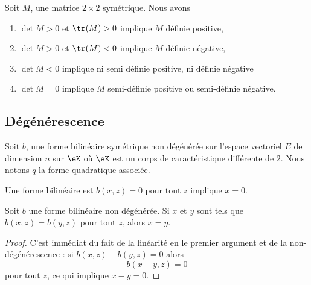 \begin{proposition}     \label{PropcnJyXZ}
    Soit $M$, une matrice $2\times 2$ symétrique. Nous avons
    \begin{enumerate}
        \item
        $\det M>0$ et $\tr(M)>0$ implique $M$ définie positive,
        \item
        $\det M>0$ et $\tr(M)<0$ implique $M$ définie négative,
    \item   \label{ItemluuFPN}
        $\det M<0$ implique ni semi définie positive, ni définie négative 
        \item
        $\det M=0$ implique $M$ semi-définie positive ou semi-définie négative.
    \end{enumerate}
\end{proposition}

\subsection{Dégénérescence}

Soit \( b\), une forme bilinéaire symétrique non dégénérée  sur l'espace vectoriel \( E\) de dimension \( n\) sur \( \eK\) où \( \eK\) est un corps de caractéristique différente de \( 2\). Nous notons \( q\) la forme quadratique associée.

\begin{definition}
    Une forme bilinéaire est  \( b(x,z)=0\) pour tout \( z\) implique \( x=0\).
\end{definition}

\begin{lemma}   \label{LemyKJpVP}
    Soit \( b\) une forme bilinéaire non dégénérée. Si \( x\) et \( y\) sont tels que \( b(x,z)=b(y,z)\) pour tout \( z\), alors \( x=y\).
\end{lemma}

\begin{proof}
    C'est immédiat du fait de la linéarité en le premier argument et de la non-dégénérescence : si \( b(x,z)-b(y,z)=0\) alors
    \begin{equation}
        b(x-y,z)=0
    \end{equation}
    pour tout \( z\), ce qui implique \( x-y=0\).
\end{proof}

